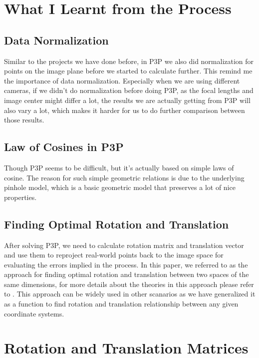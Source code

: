 \documentclass[conference]{IEEEtran}
\begin{document}
\section{What I Learnt from the Process}
\subsection{Data Normalization}
Similar to the projects we have done before, in P3P we also did normalization for points on the image plane before we started to calculate further. This remind me the importance of data normalization. Especially when we are using different cameras, if we didn't do normalization before doing P3P, as the focal lengths and image center might differ a lot, the results we are actually getting from P3P will also vary a lot, which makes it harder for us to do further comparison between those results.
\subsection{Law of Cosines in P3P}
Though P3P seems to be difficult, but it's actually based on simple laws of cosine. The reason for such simple geometric relations is due to the underlying pinhole model, which is a basic geometric model that preserves a lot of nice properties.
\subsection{Finding Optimal Rotation and Translation}
After solving P3P, we need to calculate rotation matrix and translation vector and use them to reproject real-world points back to the image space for evaluating the errors implied in the process. In this paper, we referred to \cite{optimaltrans} as the approach for finding optimal rotation and translation between two spaces of the same dimensions, for more details about the theories in this approach please refer to \cite{besl1992method}. This approach can be widely used in other scanarios as we have generalized it as a function to find rotation and translation relationship between any given coordinate systems.



\onecolumn
\section{Rotation and Translation Matrices}
\end{document}
